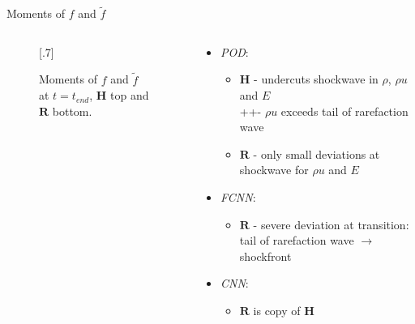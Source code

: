 \documentclass[usenames,dvipsnames,Nike,mathserif]{tuberlinbeamer}
\begin{document}
\begin{frame}[fragile]{Moments of $f$ and $\tilde{f}$}
	\begin{columns}
		\begin{column}{.61\textwidth}
			\begin{figure}
				\scalebox{.7}[.7]{}
				\caption{
					Moments of $f$ and $\tilde{f}$ at $t=t_{end}$, $\mathbf{H}$ top and $\mathbf{R}$ bottom.}
			\end{figure}
		\end{column}
		\begin{column}{.39\textwidth}
			\begin{itemize}
				\item<2->\emph{POD}:
				\begin{itemize}
					\item $\mathbf{H}$ - undercuts shockwave in $\rho$, $\rho u$ and $E$\\
									   ++\quad - $\rho u$ exceeds tail of rarefaction wave
					
					\item $\mathbf{R}$ - only small deviations at shockwave for $\rho u$ and $E$
				\end{itemize}
				\item<3->\emph{FCNN}:
				\begin{itemize}
					\item $\mathbf{R}$ - severe deviation at transition: tail of rarefaction wave $\rightarrow$ shockfront 
				\end{itemize}
				\item<4->\emph{CNN}:
				\begin{itemize}
					\item $\mathbf{R}$ is copy of $\mathbf{H}$ 
				\end{itemize}
			\end{itemize}
		\end{column}
	\end{columns}
\end{frame}
\end{document}
